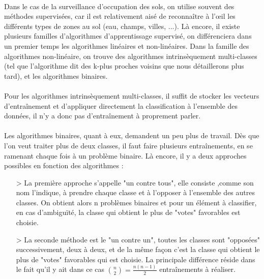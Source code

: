 \paragraph{}
Dans le cas de la surveillance d'occupation des sols, on utilise souvent des méthodes supervisées, car il est relativement aisé de reconnaître à l'œil les différents types de zones au sol (eau, champs, villes, ...). Là encore, il existe plusieurs familles d'algorithmes d'apprentissage supervisé, on différenciera dans un premier temps les algorithmes linéaires et non-linéaires. Dans la famille des algorithmes non-linéaire, on trouve des algorithmes intrinsèquement multi-classes (tel que l'algorithme dit des k-plus proches voisins que nous détaillerons plus tard), et les algorithmes binaires.
\paragraph{}
Pour les algorithmes intrinsèquement multi-classes, il suffit de stocker les vecteurs d’entraînement et d'appliquer directement la classification à l'ensemble des données, il n'y a donc pas d’entraînement à proprement parler.
\paragraph{}
Les algorithmes binaires, quant à eux, demandent un peu plus de travail. Dès que l'on veut traiter plus de deux classes, il faut faire plusieurs entraînements, en se ramenant chaque fois à un problème binaire. Là encore, il y a deux approches possibles en fonction des algorithmes :
 \begin{itemize}
   \item[>] La première approche s'appelle "un contre tous", elle consiste ,comme son nom l'indique, à prendre chaque classe et à l'opposer à l'ensemble des autres classes. On obtient alors n problèmes binaires et pour un élément à classifier, en cas d'ambiguïté, la classe qui obtient le plus de "votes" favorables est choisie.
   \item[>] La seconde méthode est le "un contre un", toutes les classes sont "opposées" successivement, deux à deux, et de la même façon c'est la classe qui obtient le plus de "votes" favorables qui est choisie. La principale différence réside dans le fait qu'il y ait dans ce cas ${n \choose 2}=\frac{n(n-1)}{2}$ entraînements à réaliser.
 \end{itemize}

